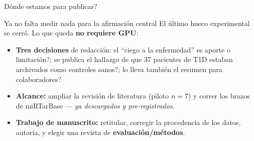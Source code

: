 \begin{frame}{\textquestiondown{}D\'onde estamos para publicar?}
  \begin{block}{Ya no falta medir nada para la afirmaci\'on central}
    \small
    El \'ultimo hueco experimental se cerr\'o. Lo que queda \textbf{no requiere GPU}:
    \begin{itemize}
      \item<2-> \textbf{Tres decisiones} de redacci\'on: \textquestiondown{}el
            ``ciego a la enfermedad'' es aporte o limitaci\'on?; \textquestiondown{}se
            publica el hallazgo de que 37 pacientes de T1D estaban archivados como
            controles sanos?; \textquestiondown{}lo lleva tambi\'en el resumen para
            colaboradores?
      \item<3-> \textbf{Alcance:} ampliar la revisi\'on de literatura (piloto $n=7$) y
            correr los brazos de miRTarBase --- \emph{ya descargados y pre-registrados}.
      \item<4-> \textbf{Trabajo de manuscrito:} retitular, corregir la procedencia de los
            datos, autor\'ia, y elegir una revista de \textbf{evaluaci\'on/m\'etodos}.
    \end{itemize}
  \end{block}

  \vspace{0.2em}
\end{frame}

